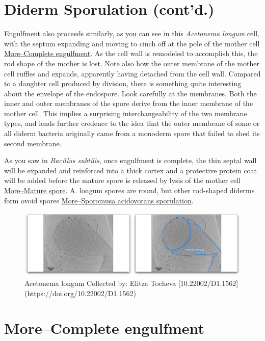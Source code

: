 \documentclass[]{tufte-book}
\begin{document}
\section{Diderm Sporulation (cont'd.)}\label{diderm-sporulation-contd.}

Engulfment also proceeds similarly, as you can see in this
\emph{Acetonema longum} cell, with the septum expanding and moving to
cinch off at the pole of the mother cell
\protect\hyperlink{morecomplete-engulfment}{More--Complete engulfment}.
As the cell wall is remodeled to accomplish this, the rod shape of the
mother is lost. Note also how the outer membrane of the mother cell
ruffles and expands, apparently having detached from the cell wall.
Compared to a daughter cell produced by division, there is something
quite interesting about the envelope of the endospore. Look carefully at
the membranes. Both the inner and outer membranes of the spore derive
from the inner membrane of the mother cell. This implies a surprising
interchangeability of the two membrane types, and lends further credence
to the idea that the outer membrane of some or all diderm bacteria
originally came from a monoderm spore that failed to shed its second
membrane.

As you saw in \emph{Bacillus subtilis}, once engulfment is complete, the
thin septal wall will be expanded and reinforced into a thick cortex and
a protective protein coat will be added before the mature spore is
released by lysis of the mother cell
\protect\hyperlink{moremature-spore}{More--Mature spore}. A. longum
spores are round, but other rod-shaped diderms form ovoid spores
\protect\hyperlink{moresporomusa-acidovorans-sporulation}{More--Sporomusa
acidovorans sporulation}.

\begin{figure}
\includegraphics{movie_stills/8_10} \caption[Acetonema longum Collected by]{Acetonema longum Collected by: Elitza Tocheva [10.22002/D1.1562](https://doi.org/10.22002/D1.1562)}\label{fig:unnamed-chunk-146}
\end{figure}

\hypertarget{morecomplete-engulfment}{\section{More--Complete
engulfment}\label{morecomplete-engulfment}}
\end{document}
